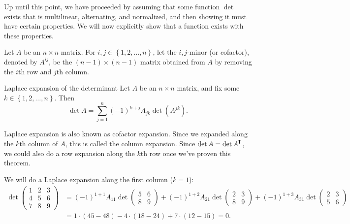 \begin{rmk}
    Up until this point, we have proceeded by assuming that some function $\det$ exists that is multilinear, alternating, and normalized, and then showing it must have certain properties. We will now explicitly show that a function exists with these properties.
\end{rmk}

\begin{defn}
    Let $A$ be an $n \times n$ matrix. For $i, j \in \left\{1, 2, \ldots, n\right\}$, let the $i,j$-minor (or cofactor), denoted by $A^{ij}$, be the $(n-1) \times (n-1)$ matrix obtained from $A$ by removing the $i$th row and $j$th column.
\end{defn}

\begin{thm}Laplace expansion of the determinant\proofbreak
    Let $A$ be an $n \times n$ matrix, and fix some $k \in \left\{1, 2, \ldots, n\right\}$. Then
    \[\det A = \sum_{j=1}^{n}(-1)^{k+j}A_{jk}\det(A^{jk}).\]
\end{thm}

\begin{rmk}
    Laplace expansion is also known as cofactor expansion. Since we expanded along the $k$th column of $A$, this is called the column expansion. Since $\det A = \det A^{\mkern-1.5mu\mathsf{T}}$, we could also do a row expansion along the $k$th row once we've proven this theorem.
\end{rmk}

\begin{exmp}
    We will do a Laplace expansion along the first column ($k=1$):
    \begin{align*}
        \det \begin{pmatrix}
            1 &2 &3 \\
            4 &5 &6 \\
            7 &8 &9
        \end{pmatrix}
        &= (-1)^{1+1}A_{11}\det \begin{pmatrix}
            5 & 6 \\ 8 & 9
        \end{pmatrix} + (-1)^{1+2}A_{21}\det \begin{pmatrix}
            2 & 3 \\ 8 & 9
        \end{pmatrix} + (-1)^{1+3}A_{31}\det \begin{pmatrix}
            2 & 3 \\ 5 & 6
        \end{pmatrix} \\
        &= 1\cdot(45 - 48) - 4\cdot(18 - 24) + 7\cdot(12 - 15) = 0.
    \end{align*}
\end{exmp}

